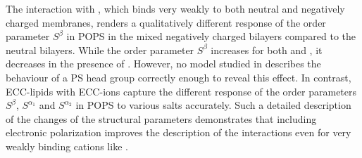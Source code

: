 \documentclass[journal=jpcbfk,manuscript=article]{achemso}
\begin{document}
The interaction with , which binds very weakly to both neutral and negatively charged membranes, 
renders a qualitatively different response of the order parameter $S^\beta$ in POPS in the mixed negatively charged bilayers compared to the neutral bilayers. 
While the order parameter $S^\beta$ increases for both  and ,
it decreases in the presence of .
However, no model studied in \citep{nmrlipids_proj4} describes the behaviour of a PS head group correctly enough to reveal this effect. 
In contrast, ECC-lipids with ECC-ions capture the different response of the order parameters $S^{\beta}$, $S^{\alpha _1}$ and $S^{\alpha _2}$ in POPS to various salts accurately. 
Such a detailed description of the changes of the structural parameters 
demonstrates that including electronic polarization
improves the description of the interactions even for very weakly binding cations like . 
\end{document}
